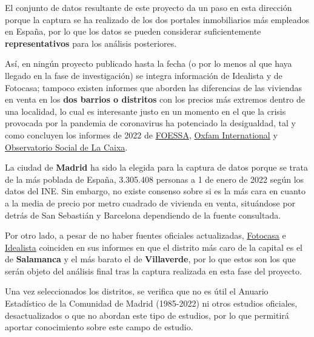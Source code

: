 \documentclass[12pt]{article}
\begin{document}
El conjunto de datos resultante de este proyecto da un paso en esta dirección porque la captura se ha realizado de los dos portales inmobiliarios más empleados en España, por lo que los datos se pueden considerar suficientemente \textbf{representativos} para los análisis posteriores. 

Así, en ningún proyecto publicado hasta la fecha (o por lo menos al que haya llegado en la fase de investigación) se integra información de Idealista y de Fotocasa; tampoco existen informes que aborden las diferencias de las viviendas en venta en los \textbf{dos barrios o distritos} con los precios más extremos dentro de una localidad, lo cual es interesante justo en un momento en el que la crisis provocada por la pandemia de coronavirus ha potenciado la desigualdad, tal y como concluyen los informes de 2022 de \href{https://www.foessa.es/blog/foessa-presenta-la-primera-radiografia-social-completa-de-la-crisis-de-la-covid-19-en-toda-espana/}{FOESSA}, \href{https://oxfamilibrary.openrepository.com/bitstream/handle/10546/621341/bp-inequality-kills-170122-es.pdf}{Oxfam International} y \href{https://elobservatoriosocial.fundacionlacaixa.org/documents/22890/492074/T01_ID_ES_AyalaCant%C3%B3.pdf/a0746431-109f-e009-6c77-296c378f0438?t=1642072938395}{Observatorio Social de La Caixa}.

La ciudad de \textbf{Madrid} ha sido la elegida para la captura de datos porque se trata de la más poblada de España, 3.305.408 personas a 1 de enero de 2022 según los datos del INE. Sin embargo, no existe consenso sobre si es la más cara en cuanto a la media de precio por metro cuadrado de vivienda en venta, situándose por detrás de San Sebastián y Barcelona dependiendo de la fuente consultada. 

Por otro lado, a pesar de no haber fuentes oficiales actualizadas, \href{https://www.fotocasa.es/fotocasa-life/compraventa/conoce-el-precio-de-la-vivienda-en-venta-este-mes/}{Fotocasa} e \href{https://www.idealista.com/sala-de-prensa/informes-precio-vivienda/venta/madrid-comunidad/madrid-provincia/madrid/}{Idealista} coinciden en sus informes en que el distrito más caro de la capital es el de \textbf{Salamanca} y el más barato el de \textbf{Villaverde}, por lo que estos son los que serán objeto del análisis final tras la captura realizada en esta fase del proyecto.

Una vez seleccionados los distritos, se verifica que no es útil el Anuario Estadístico de la Comunidad de Madrid (1985-2022) ni otros estudios oficiales, desactualizados o que no abordan este tipo de estudios, por lo que permitirá aportar conocimiento sobre este campo de estudio. 
\end{document}
